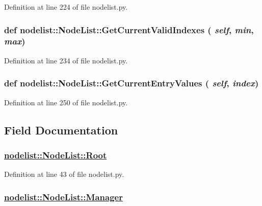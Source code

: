 Definition at line 224 of file nodelist.py.\hypertarget{classnodelist_1_1NodeList_e98e03e88809cf1dec3c4dc3c8921c99}{
\subsubsection[GetCurrentValidIndexes]{\setlength{\rightskip}{0pt plus 5cm}def nodelist::Node\-List::Get\-Current\-Valid\-Indexes ( {\em self},  {\em min},  {\em max})}}
\label{classnodelist_1_1NodeList_e98e03e88809cf1dec3c4dc3c8921c99}




Definition at line 234 of file nodelist.py.\hypertarget{classnodelist_1_1NodeList_005f913bbbfe322fde2aaef4a1521843}{
\subsubsection[GetCurrentEntryValues]{\setlength{\rightskip}{0pt plus 5cm}def nodelist::Node\-List::Get\-Current\-Entry\-Values ( {\em self},  {\em index})}}
\label{classnodelist_1_1NodeList_005f913bbbfe322fde2aaef4a1521843}




Definition at line 250 of file nodelist.py.

\subsection{Field Documentation}
\hypertarget{classnodelist_1_1NodeList_b2f15765f2bd7a7bc5038102e491e87c}{
\subsubsection[Root]{\setlength{\rightskip}{0pt plus 5cm}\hyperlink{classnodelist_1_1NodeList_b2f15765f2bd7a7bc5038102e491e87c}{nodelist::Node\-List::Root}}}
\label{classnodelist_1_1NodeList_b2f15765f2bd7a7bc5038102e491e87c}




Definition at line 43 of file nodelist.py.\hypertarget{classnodelist_1_1NodeList_629a8a12f02ae1f7d02d0ef7bb0afcbf}{
\subsubsection[Manager]{\setlength{\rightskip}{0pt plus 5cm}\hyperlink{classnodelist_1_1NodeList_629a8a12f02ae1f7d02d0ef7bb0afcbf}{nodelist::Node\-List::Manager}}}
\label{classnodelist_1_1NodeList_629a8a12f02ae1f7d02d0ef7bb0afcbf}




